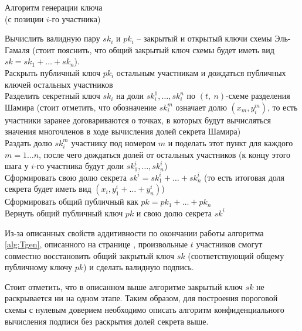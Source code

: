\documentclass[a4paper,12pt]{article}
\theoremstyle{definition}
\begin{document}
		\begin{algorithm}
			\caption{Алгоритм генерации ключа \\ (с позиции $i$-го участника)}
			\label{alg:Tgen}
	
	
			\setlength{\parskip}{0.4\baselineskip}
	
			Вычислить валидную пару $sk_i$ и $pk_i$ \--- закрытый и открытый ключи схемы Эль-Гамаля \linebreak
			(стоит пояснить, что общий закрытый ключ схемы будет иметь вид $sk=sk_1+\dots+sk_n$).
			\\Раскрыть публичный ключ $pk_i$ остальным участникам и дождаться публичных ключей остальных участников
			\\Разделить секретный ключ $sk_i$ на доли $sk_i^1, \dots, sk_i^n$ по $(t,~n)$-схеме разделения Шамира \linebreak (стоит отметить, что обозначение $sk_i^m$ означает долю $(x_m, y_i^m)$,  то есть участники заранее договариваются о точках, в 	которых будут вычисляться значения многочленов в ходе вычисления долей секрета Шамира)
			\\Раздать долю $sk_i^m$ участнику под номером $m$ и поделать этот пункт для каждого $m=1\dots n$, после чего дождаться долей от остальных участников (к концу этого шага у $i$-го участника будут доли $sk_1^i, \dots, sk_n^i$)
			\\Сформировать свою долю секрета $sk^i=sk_1^i+\dots+sk_n^i$ (то есть итоговая доля секрета будет иметь вид $(x_i, y_1^i+\dots+y_n^i)$)
			\\Сформировать общий публичный как $pk=pk_1+\dots+pk_n$
			\\Вернуть общий публичный ключ $pk$ и свою долю секрета $sk^i$
	
		\end{algorithm}

		
		Из-за описанных свойств аддитивности по окончании работы алгоритма \ref{alg:Tgen}, описанного на странице \pageref{alg:Tgen}, произвольные $t$ участников смогут совместно восстановить общий закрытый ключ $sk$ (соответствующий общему публичному ключу $pk$) и сделать валидную подпись. 
		
		Стоит отметить, что в описанном выше алгоритме закрытый ключ $sk$ не раскрывается ни на одном этапе. Таким образом, для построения пороговой схемы с нулевым доверием необходимо описать алгоритм конфиденциального вычисления подписи без раскрытия долей секрета выше.
		
\end{document}
